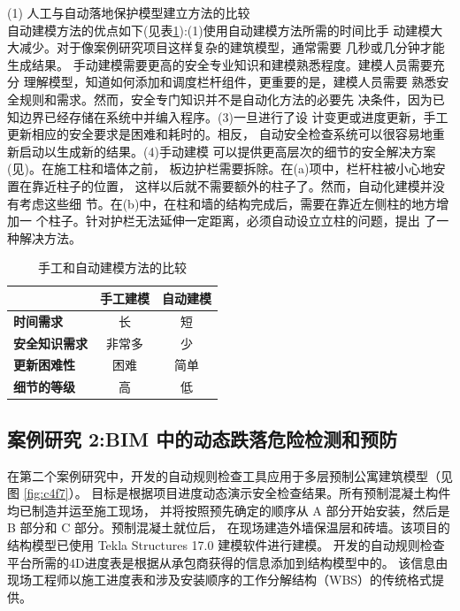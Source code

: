 (1) 人工与自动落地保护模型建立方法的比较\\

自动建模方法的优点如下(见表\ref{tb:compare}):(1)使用自动建模方法所需的时间比手
动建模大大减少。对于像案例研究项目这样复杂的建筑模型，通常需要
几秒或几分钟才能生成结果。
手动建模需要更高的安全专业知识和建模熟悉程度。建模人员需要充分
理解模型，知道如何添加和调度栏杆组件，更重要的是，建模人员需要
熟悉安全规则和需求。然而，安全专门知识并不是自动化方法的必要先
决条件，因为已知边界已经存储在系统中并编入程序。(3)一旦进行了设
计变更或进度更新，手工更新相应的安全要求是困难和耗时的。相反，
自动安全检查系统可以很容易地重新启动以生成新的结果。(4)手动建模
可以提供更高层次的细节的安全解决方案(见)。在施工柱和墙体之前，
板边护栏需要拆除。在(a)项中，栏杆柱被小心地安置在靠近柱子的位置，
这样以后就不需要额外的柱子了。然而，自动化建模并没有考虑这些细
节。在(b)中，在柱和墙的结构完成后，需要在靠近左侧柱的地方增加一
个柱子。针对护栏无法延伸一定距离，必须自动设立立柱的问题，提出
了一种解决方法。

\begin{table}[thbp]
    \caption{手工和自动建模方法的比较}
    \begin{center}
        \begin{tabular}{@{}lcc@{}}
            \toprule
            \multicolumn{1}{c}{\textbf{}} & \textbf{手工建模} & \textbf{自动建模} \\ \midrule
            \textbf{时间需求} & 长 & 短 \\
            \textbf{安全知识需求} & 非常多 & 少 \\
            \textbf{更新困难性} & 困难 & 简单 \\
            \textbf{细节的等级} & 高 & 低 \\ \bottomrule
            \end{tabular}
    \end{center}
    \label{tb:compare}
    \end{table}

\subsection{案例研究 2:BIM 中的动态跌落危险检测和预防}

在第二个案例研究中，开发的自动规则检查工具应用于多层预制公寓建筑模型（见图 \ref{fig:c4f7}）。
目标是根据项目进度动态演示安全检查结果。所有预制混凝土构件均已制造并运至施工现场，
并将按照预先确定的顺序从 A 部分开始安装，然后是 B 部分和 C 部分。预制混凝土就位后，
在现场建造外墙保温层和砖墙。该项目的结构模型已使用 Tekla Structures 17.0 建模软件进行建模。
开发的自动规则检查平台所需的4D进度表是根据从承包商获得的信息添加到结构模型中的。
该信息由现场工程师以施工进度表和涉及安装顺序的工作分解结构（WBS）的传统格式提供。

